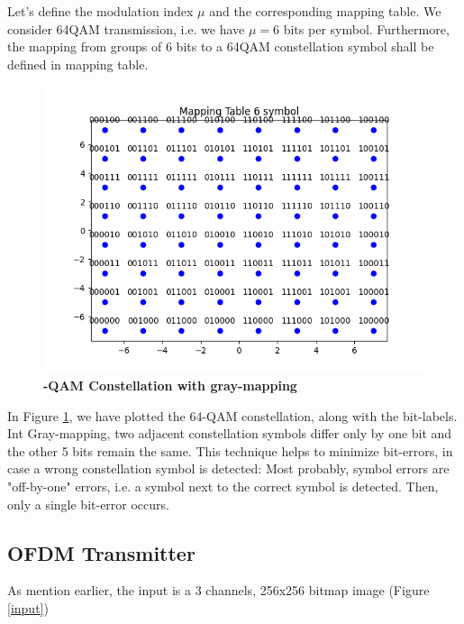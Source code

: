 Let's define the modulation index $\mu$ and the corresponding mapping table. We consider 64QAM transmission, i.e. we have $\mu=6$ bits per symbol. Furthermore, the mapping from groups of 6 bits to a 64QAM constellation symbol shall be defined in mapping table.

\begin{figure}[ht]
    \centering
    \includegraphics[width=\textwidth]{../Source/results/mapping.png}
    \caption{\bfseries\centering\fontsize{13pt}{0pt}-QAM Constellation with gray-mapping}
    \label{mapping}
\end{figure}

In Figure \ref{mapping}, we have plotted the 64-QAM constellation, along with the bit-labels.
Int Gray-mapping, two adjacent constellation symbols differ only by one bit and the other 5 bits remain the same. This technique helps to minimize bit-errors, in case a wrong constellation symbol is detected: Most probably, symbol errors are "off-by-one" errors, i.e. a symbol next to the correct symbol is detected. Then, only a single bit-error occurs.

\subsection{OFDM Transmitter}

As mention earlier, the input is a 3 channels, 256x256 bitmap image (Figure \ref{input})

